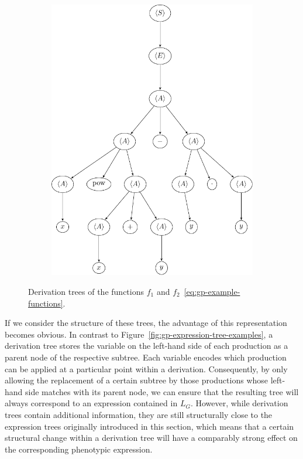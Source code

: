 \begin{figure}[!ht]
\begin{subfigure}{\textwidth}
	\includegraphics[scale=0.474]{figures/trees/gp_derivation_tree2.pdf}
	\end{subfigure}
	\caption{Derivation trees of the functions $f_1$ and $f_2$~\eqref{eq:gp-example-functions}.}
	\label{fig:gp-derivation-tree-examples}
\end{figure}
If we consider the structure of these trees, the advantage of this representation becomes obvious.
In contrast to Figure~\ref{fig:gp-expression-tree-examples}, a derivation tree stores the variable on the left-hand side of each production as a parent node of the respective subtree.
Each variable encodes which production can be applied at a particular point within a derivation.
Consequently, by only allowing the replacement of a certain subtree by those productions whose left-hand side matches with its parent node, we can ensure that the resulting tree will always correspond to an expression contained in $L_G$. 
However, while derivation trees contain additional information, they are still structurally close to the expression trees originally introduced in this section, which means that a certain structural change within a derivation tree will have a comparably strong effect on the corresponding phenotypic expression.
